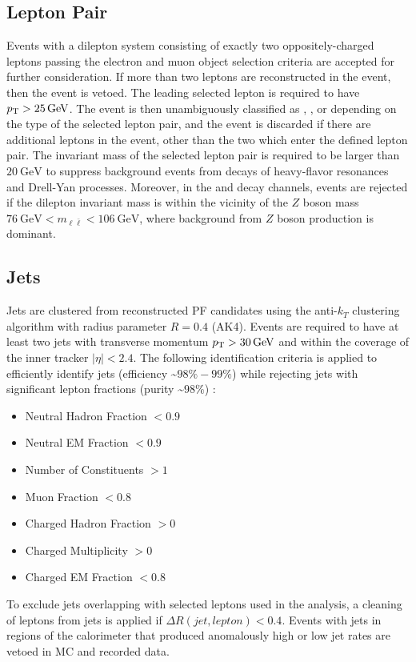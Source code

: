 \subsection{Lepton Pair}
Events with a dilepton system consisting of exactly two oppositely-charged leptons passing the electron and muon object selection criteria are accepted for further consideration.
If more than two leptons are reconstructed in the event, then the event is vetoed.
The leading selected lepton is required to have $\pT > \SI{25}{\GeV}$.
The event is then unambiguously classified as \ee, \emu, or \mumu depending on the type of the selected lepton pair, and the event is discarded if there are additional leptons in the event, other than the two which enter the defined lepton pair.
The invariant mass of the selected lepton pair is required to be larger than $\SI{20}{\GeV}$ to suppress background events from decays of heavy-flavor resonances and Drell-Yan processes.
Moreover, in the \ee and \mumu decay channels, events are rejected if the dilepton invariant mass is within the vicinity of the $Z$ boson mass $\SI{76}{\GeV} < m_{\ell\bar{\ell}} < \SI{106}{\GeV}$, where background from $Z$ boson production is dominant.

\subsection{Jets}
Jets are clustered from reconstructed PF candidates using the anti-$k_T$ clustering algorithm with radius parameter $R = 0.4$ (AK4).
Events are required to have at least two jets with transverse momentum $\pT > \SI{30}{\GeV}$ and within the coverage of the inner tracker $\vert \eta \vert < 2.4$. 
The following identification criteria is applied to efficiently identify jets (efficiency \sim $98\% - 99\%$) while rejecting jets with significant lepton fractions (purity \sim $98\%$) :
\begin{itemize}
\item Neutral Hadron Fraction $<0.9$
\item Neutral EM Fraction $<0.9$
\item Number of Constituents $>1$
\item Muon Fraction $<0.8$
\item Charged Hadron Fraction $>0$
\item Charged Multiplicity $> 0$
\item Charged EM Fraction $<0.8$ 
\end{itemize}
To exclude jets overlapping with selected leptons used in the analysis, a cleaning of leptons from jets is applied if $\Delta R(jet,lepton)<0.4$.
Events with jets in regions of the calorimeter that produced anomalously high or low jet rates are vetoed in MC and recorded data.

